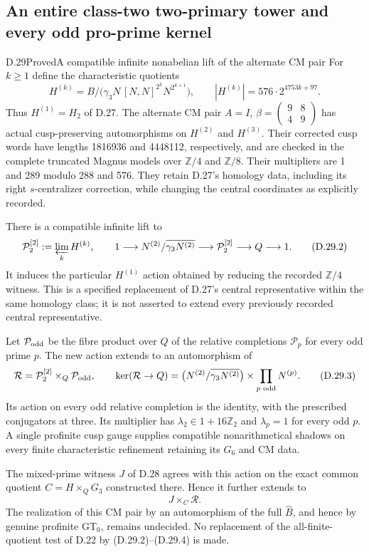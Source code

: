 \subsection{An entire class-two two-primary tower and every odd pro-prime kernel}

\begin{statement}{D.29}{Proved}{A compatible infinite nonabelian lift of the alternate CM pair}
For $k\geq1$ define the characteristic quotients
\[
 H^{(k)}=B/\bigl(\gamma_3N\,[N,N]^{2^k}N^{2^{k+1}}\bigr),
 \qquad |H^{(k)}|=576\cdot2^{4753k+97}.                  \tag{D.29.1}
\]
Thus $H^{(1)}=H_2$ of D.27. The alternate CM pair
$A=I$, $\beta=\left(\begin{smallmatrix}9&8\\4&9\end{smallmatrix}\right)$
has actual cusp-preserving automorphisms on $H^{(2)}$
and $H^{(3)}$. Their corrected cusp words have lengths
1816936 and 4448112, respectively, and are checked in the
complete truncated Magnus models over $\mathbb Z/4$
and $\mathbb Z/8$. Their multipliers are 1 and 289 modulo
288 and 576. They retain D.27's homology data, including
its right $s$-centralizer correction, while changing
the central coordinates as explicitly recorded.

There is a compatible infinite lift to
\[
 \mathcal P_2^{[2]}:=\varprojlim_k H^{(k)},\qquad
 1\longrightarrow N^{(2)}/\overline{\gamma_3N^{(2)}}
 \longrightarrow\mathcal P_2^{[2]}
 \longrightarrow Q\longrightarrow1.                  \tag{D.29.2}
\]
It induces the particular $H^{(1)}$ action obtained by
reducing the recorded $\mathbb Z/4$ witness. This is a
specified replacement of D.27's central representative
within the same homology class; it is not asserted to
extend every previously recorded central representative.

Let $\mathcal P_{\rm odd}$ be the fibre product over $Q$
of the relative completions $\mathcal P_p$ for every odd
prime $p$. The new action extends to an automorphism of
\[
 \mathcal R=\mathcal P_2^{[2]}\times_Q\mathcal P_{\rm odd},
 \qquad
 \ker(\mathcal R\to Q)=
 \bigl(N^{(2)}/\overline{\gamma_3N^{(2)}}\bigr)
 \times\prod_{p\text{ odd}}N^{(p)}.                    \tag{D.29.3}
\]
Its action on every odd relative completion is the identity,
with the prescribed conjugators at three. Its multiplier
has $\lambda_2\in1+16\mathbb Z_2$ and $\lambda_p=1$
for every odd $p$. A single profinite cusp gauge supplies
compatible nonarithmetical shadows on every finite
characteristic refinement retaining its $G_6$ and CM data.

The mixed-prime witness $J$ of D.28 agrees with this action
on the exact common quotient $C=H\times_QG_3$ constructed
there. Hence it further extends to
\[
                J\times_C\mathcal R.                 \tag{D.29.4}
\]
The realization of this CM pair by an automorphism of the
full $\widehat B$, and hence by genuine profinite GT$_0$,
remains undecided. No replacement of the all-finite-quotient
test of D.22 by (D.29.2)--(D.29.4) is made.
\end{statement}
